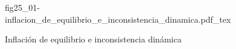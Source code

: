 \begin{figure}[h]
\centering
\def\svgwidth{0.5\textwidth}
{fig25_01-inflacion_de_equilibrio_e_inconsistencia_dinamica.pdf_tex}
\caption{Inflación de equilibrio e inconsistencia dinámica}
\label{fig25_01-inflacion_de_equilibrio_e_inconsistencia_dinamica}
\end{figure}